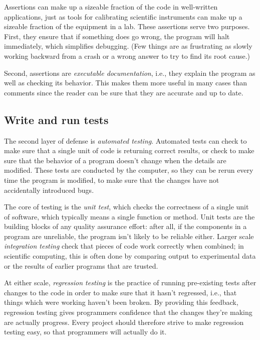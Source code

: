 \documentclass{article}
\newcommand{\term}[1]{\emph{#1}}
\begin{document}
\noindent
Assertions can make up a sizeable fraction of the code in well-written
applications, just as tools for calibrating scientific instruments can
make up a sizeable fraction of the equipment in a lab.  These
assertions serve two purposes. First, they ensure that if something
does go wrong, the program will halt immediately, which simplifies
debugging. (Few things are as frustrating as slowly working backward
from a crash or a wrong answer to try to find its root cause.)

Second, assertions are \term{executable documentation}, i.e., they
explain the program as well as checking its behavior. This makes them
more useful in many cases than comments since the reader can be sure
that they are accurate and up to date.

\subsection{Write and run tests}\label{unittest}

The second layer of defense is \term{automated testing}. Automated tests
can check to make sure that a single unit of code is returning correct
results, or check to make sure that the behavior of a program doesn't
change when the details are modified. These tests are conducted by the
computer, so they can be rerun every time the program is modified, to 
make sure that the changes have not accidentally introduced bugs.

The core of testing is the \term{unit test}, which checks the
correctness of a single unit of software, which typically means a
single function or method. Unit tests are the building blocks of any
quality assurance effort: after all, if the components in a program
are unreliable, the program isn't likely to be reliable either. Larger
scale \term{integration testing} check that pieces of code work
correctly when combined; in scientific computing, this is often done
by comparing output to experimental data or the results of earlier
programs that are trusted.

At either scale, \term{regression testing} is the practice of running
pre-existing tests after changes to the code in order to make sure
that it hasn't regressed, i.e., that things which were working haven't
been broken.  By providing this feedback, regression testing gives
programmers confidence that the changes they're making are actually
progress.  Every project should therefore strive to make regression
testing easy, so that programmers will actually do it.
\end{document}
